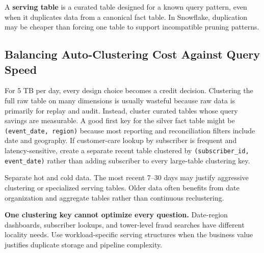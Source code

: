 \begin{definitionbox}
A \textbf{serving table} is a curated table designed for a known query pattern, even when it duplicates data from a canonical fact table. In Snowflake, duplication may be cheaper than forcing one table to support incompatible pruning patterns.
\end{definitionbox}

\subsection{Balancing Auto-Clustering Cost Against Query Speed}
For 5 TB per day, every design choice becomes a credit decision. Clustering the full raw table on many dimensions is usually wasteful because raw data is primarily for replay and audit. Instead, cluster curated tables whose query savings are measurable. A good first key for the silver fact table might be \texttt{(event\_date, region)} because most reporting and reconciliation filters include date and geography. If customer-care lookup by subscriber is frequent and latency-sensitive, create a separate recent table clustered by \texttt{(subscriber\_id, event\_date)} rather than adding subscriber to every large-table clustering key.

\begin{tipbox}
Separate hot and cold data. The most recent 7--30 days may justify aggressive clustering or specialized serving tables. Older data often benefits from date organization and aggregate tables rather than continuous reclustering.
\end{tipbox}

\begin{pitfall}
\textbf{One clustering key cannot optimize every question.} Date-region dashboards, subscriber lookups, and tower-level fraud searches have different locality needs. Use workload-specific serving structures when the business value justifies duplicate storage and pipeline complexity.
\end{pitfall}

